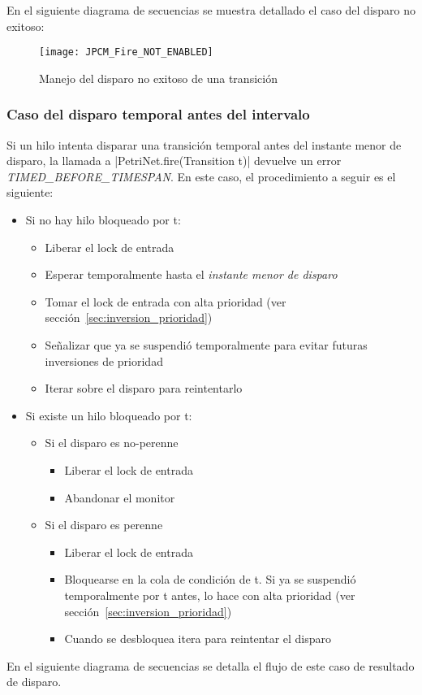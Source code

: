 En el siguiente diagrama de secuencias se muestra detallado el caso del disparo
no exitoso:

\begin{figure}[H]
  \hspace*{-2cm}
  \texttt{[image: JPCM\_Fire\_NOT\_ENABLED]}
  \caption{Manejo del disparo no exitoso de una transición}
  \label{fig:JPCM_Fire_NOT_ENABLED}
\end{figure}

\subsubsection*{Caso del disparo temporal antes del intervalo}
Si un hilo intenta disparar una transición temporal antes del instante menor de
disparo, la llamada a |PetriNet.fire(Transition t)| devuelve un error
\textit{TIMED\_BEFORE\_TIMESPAN}.
En este caso, el procedimiento a seguir es el siguiente:
\begin{itemize}
  \item Si no hay hilo bloqueado por t:
      \begin{itemize}
        \item Liberar el lock de entrada
        \item Esperar temporalmente hasta el \textit{instante menor de disparo}
        \item Tomar el lock de entrada con alta prioridad (ver
        sección~\ref{sec:inversion_prioridad})
        \item Señalizar que ya se suspendió temporalmente para evitar futuras
        inversiones de prioridad
        \item Iterar sobre el disparo para reintentarlo
      \end{itemize}
  \item Si existe un hilo bloqueado por t:
      \begin{itemize}
        \item Si el disparo es no-perenne
                \begin{itemize}
                  \item Liberar el lock de entrada
                  \item Abandonar el monitor
                \end{itemize}
        \item Si el disparo es perenne
                \begin{itemize}
                  \item Liberar el lock de entrada
                  \item Bloquearse en la cola de condición de t. Si ya se suspendió
                  temporalmente por t antes, lo hace con alta prioridad (ver
                  sección~\ref{sec:inversion_prioridad})
                  \item Cuando se desbloquea itera para reintentar el disparo
                \end{itemize}
      \end{itemize}
\end{itemize}
En el siguiente diagrama de secuencias se detalla el flujo de este caso de resultado de disparo.

